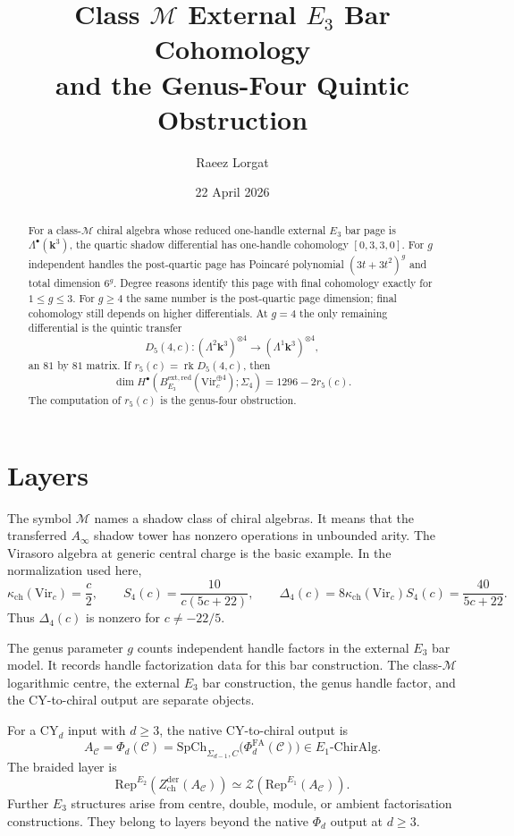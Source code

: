 \documentclass[11pt]{article}
\title{Class $\mathcal{M}$ External $E_3$ Bar Cohomology\\
and the Genus-Four Quintic Obstruction}
\author{Raeez Lorgat}
\date{22 April 2026}
\theoremstyle{plain}
\theoremstyle{definition}
\theoremstyle{remark}
\newcommand{\kk}{\mathbf{k}}
\newcommand{\cC}{\mathcal{C}}
\newcommand{\cZ}{\mathcal{Z}}
\newcommand{\Rep}{\mathrm{Rep}}
\newcommand{\Vir}{\mathrm{Vir}}
\newcommand{\kch}{\kappa_{\mathrm{ch}}}
\newcommand{\PhiFA}{\Phi^{\mathrm{FA}}}
\newcommand{\SpCh}{\mathrm{SpCh}}
\newcommand{\Zder}{Z^{\mathrm{der}}_{\mathrm{ch}}}
\newcommand{\Bext}{B_{E_3}^{\mathrm{ext,red}}}
\begin{document}
\maketitle

\begin{abstract}
For a class-$\mathcal{M}$ chiral algebra whose reduced one-handle external
$E_3$ bar page is $\Lambda^\bullet(\kk^3)$, the quartic shadow differential
has one-handle cohomology $[0,3,3,0]$. For $g$ independent handles the
post-quartic page has Poincar\'e polynomial $(3t+3t^2)^g$ and total dimension
$6^g$. Degree reasons identify this page with final cohomology exactly for
$1\leq g\leq 3$. For $g\geq 4$ the same number is the post-quartic page
dimension; final cohomology still depends on higher differentials. At $g=4$
the only remaining differential is
the quintic transfer
\[
 D_5(4,c):(\Lambda^2\kk^3)^{\otimes 4}\longrightarrow
          (\Lambda^1\kk^3)^{\otimes 4},
\]
an $81$ by $81$ matrix. If $r_5(c)=\operatorname{rk}D_5(4,c)$, then
\[
 \dim H^\bullet(\Bext(\Vir_c^{\oplus 4});\Sigma_4)=1296-2r_5(c).
\]
The computation of $r_5(c)$ is the genus-four obstruction.
\end{abstract}

\tableofcontents

\section{Layers}
\label{sec:layers}

The symbol $\mathcal{M}$ names a shadow class of chiral algebras. It means
that the transferred $A_\infty$ shadow tower has nonzero operations in
unbounded arity. The Virasoro algebra at generic central charge is the basic
example. In the normalization used here,
\[
 \kch(\Vir_c)=\frac{c}{2},\qquad
 S_4(c)=\frac{10}{c(5c+22)},\qquad
 \Delta_4(c)=8\kch(\Vir_c)S_4(c)=\frac{40}{5c+22}.
\]
Thus $\Delta_4(c)$ is nonzero for $c\neq -22/5$.

The genus parameter $g$ counts independent handle factors in the external
$E_3$ bar model. It records handle factorization data for this bar
construction. The class-$\mathcal{M}$ logarithmic centre, the external
$E_3$ bar construction, the genus handle factor, and the CY-to-chiral output
are separate objects.

For a CY$_d$ input with $d\geq 3$, the native CY-to-chiral output is
\[
 A_\cC=\Phi_d(\cC)=
 \SpCh_{\Sigma_{d-1},C}\bigl(\PhiFA_d(\cC)\bigr)\in E_1\text{-ChirAlg}.
\]
The braided layer is
\[
 \Rep^{E_2}(\Zder(A_\cC))\simeq \cZ(\Rep^{E_1}(A_\cC)).
\]
Further $E_3$ structures arise from centre, double, module, or ambient
factorisation constructions. They belong to layers beyond the native
$\Phi_d$ output at $d\geq 3$.
\end{document}
